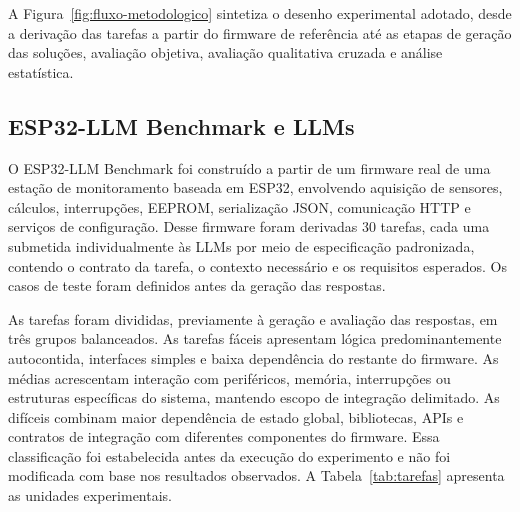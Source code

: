 \documentclass[12pt]{article}
\begin{document}
A Figura~\ref{fig:fluxo-metodologico} sintetiza o desenho experimental adotado, desde a derivação das tarefas a partir do firmware de referência até as etapas de geração das soluções, avaliação objetiva, avaliação qualitativa cruzada e análise estatística.

\subsection{ESP32-LLM Benchmark e LLMs}
\label{sec:benchmark}

O ESP32-LLM Benchmark foi construído a partir de um firmware real de uma estação de monitoramento baseada em ESP32, envolvendo aquisição de sensores, cálculos, interrupções, EEPROM, serialização JSON, comunicação HTTP e serviços de configuração. Desse firmware foram derivadas 30 tarefas, cada uma submetida individualmente às LLMs por meio de especificação padronizada, contendo o contrato da tarefa, o contexto necessário e os requisitos esperados. Os casos de teste foram definidos antes da geração das respostas.

As tarefas foram divididas, previamente à geração e avaliação das respostas, em três grupos balanceados. As tarefas fáceis apresentam lógica predominantemente autocontida, interfaces simples e baixa dependência do restante do firmware. As médias acrescentam interação com periféricos, memória, interrupções ou estruturas específicas do sistema, mantendo escopo de integração delimitado. As difíceis combinam maior dependência de estado global, bibliotecas, APIs e contratos de integração com diferentes componentes do firmware. Essa classificação foi estabelecida antes da execução do experimento e não foi modificada com base nos resultados observados. A Tabela~\ref{tab:tarefas} apresenta as unidades experimentais.
\end{document}
